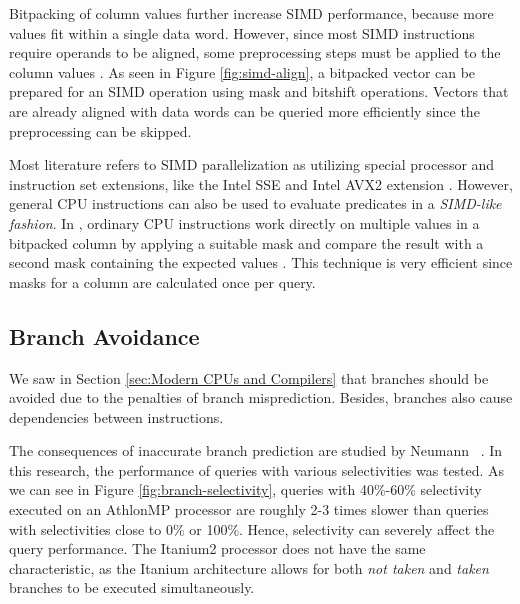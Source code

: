 Bitpacking of column values further increase SIMD performance, because more values fit within a single data word. However, since most SIMD instructions require operands to be aligned, some preprocessing steps must be applied to the column values \cite{Willhalm2009-hu}. As seen in Figure \ref{fig:simd-align}, a bitpacked vector can be prepared for an SIMD operation using mask and bitshift operations. Vectors that are already aligned with data words can be queried more efficiently since the preprocessing can be skipped.

Most literature refers to SIMD parallelization as utilizing special processor and instruction set extensions, like the Intel SSE and Intel AVX2 extension \cite{Willhalm2013-ri, Willhalm2009-hu}. However, general CPU instructions can also be used to evaluate predicates in a \textit{SIMD-like fashion}. In \blink, ordinary CPU instructions work directly on multiple values in a bitpacked column by applying a suitable mask and compare the result with a second mask containing the expected values \cite{Johnson2008-cp}. This technique is very efficient since masks for a column are calculated once per query.


\subsection{Branch Avoidance}
\label{sub:Branch Avoidance}

We saw in Section \ref{sec:Modern CPUs and Compilers} that branches should be avoided due to the penalties of branch misprediction. Besides, branches also cause dependencies between instructions. 

The consequences of inaccurate branch prediction are studied by Neumann \ea~\cite{Neumann2011-uq}. In this research, the performance of queries with various selectivities was tested. As we can see in Figure \ref{fig:branch-selectivity}, queries with 40\%-60\% selectivity executed on an AthlonMP processor are roughly 2-3 times slower than queries with selectivities close to 0\% or 100\%. Hence, selectivity can severely affect the query performance. The Itanium2 processor does not have the same characteristic, as the Itanium architecture allows for both \textit{not taken} and \textit{taken} branches to be executed simultaneously.

